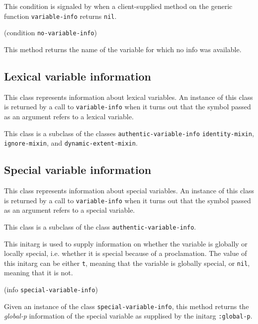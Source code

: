
This condition is signaled by \sysname{} when a client-supplied method
on the generic function \texttt{variable-info} returns \texttt{nil}.

 {(condition {\tt no-variable-info})}

This method returns the name of the variable for which no info was
available. 

\subsection{Lexical variable information}


This class represents information about lexical variables.  An
instance of this class is returned by a call to \texttt{variable-info}
when it turns out that the symbol passed as an argument refers to a
lexical variable.

This class is a subclass of the classes
\texttt{authentic-variable-info} \texttt{identity-mixin},
\texttt{ignore-mixin}, and \texttt{dynamic-extent-mixin}.

\subsection{Special variable information}


This class represents information about special variables.   An
instance of this class is returned by a call to \texttt{variable-info}
when it turns out that the symbol passed as an argument refers to a
special variable.

This class is a subclass of the class \texttt{authentic-variable-info}.


This initarg is used to supply information on whether the variable is globally or locally special, i.e. whether it is special because of a proclamation. The value of this initarg can be either \texttt{t}, meaning that the variable is globally special, or \texttt{nil}, meaning that it is not.

 {(info {\tt special-variable-info})}

Given an instance of the class \texttt{special-variable-info}, this method returns the \emph{global-p} information of the special variable as supplised by the initarg \texttt{:global-p}.

